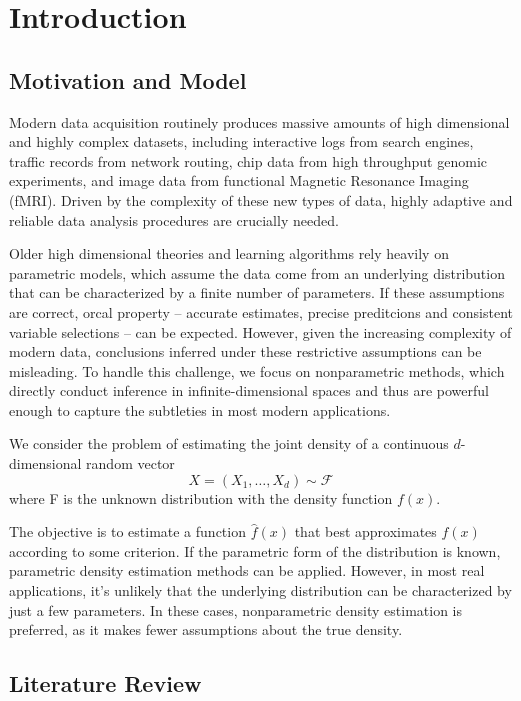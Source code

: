 \section{Introduction}
\label{sec:intro}

\subsection{Motivation and Model}

Modern data acquisition routinely produces massive amounts of high dimensional and highly complex datasets, including interactive logs from search engines, traffic records from network routing, chip data from high throughput genomic experiments, and image data from functional Magnetic Resonance Imaging (fMRI). 
Driven by the complexity of these new types of data, highly adaptive and reliable data analysis procedures are crucially needed. 

Older high dimensional theories and learning algorithms rely heavily on parametric models, which assume the data come from an underlying distribution that can be characterized by a finite number of parameters. 
If these assumptions are correct, orcal property -- accurate estimates, precise preditcions and consistent variable selections \citep{Fan2010} -- can be expected. 
However, given the increasing complexity of modern data, conclusions inferred under these restrictive assumptions can be misleading. 
To handle this challenge, we focus on nonparametric methods, which directly conduct inference in infinite-dimensional spaces and thus are powerful enough to capture the subtleties in most modern applications. 

We consider the problem of estimating the joint density of a continuous $d$-dimensional random vector 
\begin{equation}
    X=(X_1,\dots,X_d) \sim \mathcal{F}
\end{equation}
where F is the unknown distribution with the density function $f(x)$. 

The objective is to estimate a function $\hat{f}(x)$ that best approximates $f(x)$ according to some criterion. 
If the parametric form of the distribution is known, parametric density estimation methods can be applied. 
However, in most real applications, it’s unlikely that the underlying distribution can be characterized by just a few parameters. 
In these cases, nonparametric density estimation is preferred, as it makes fewer assumptions about the true density. 

\subsection{Literature Review}

